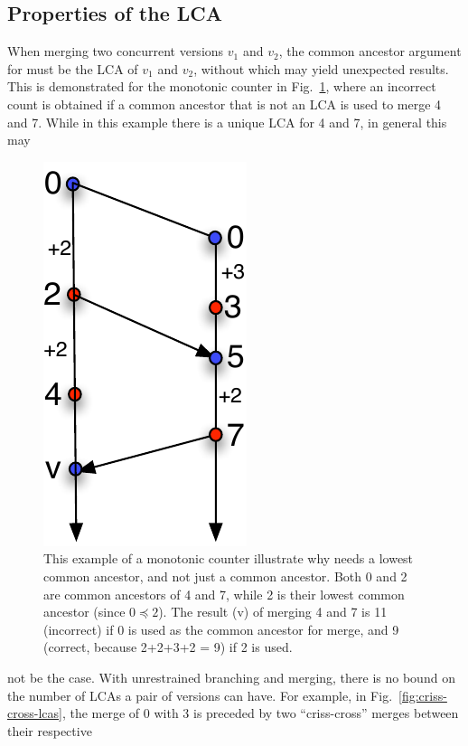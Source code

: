 \subsection{Properties of the LCA}
\label{sec:meta}

When merging two concurrent versions $v_1$ and $v_2$, the common
ancestor argument for  must be the LCA of $v_1$ and $v_2$,
without which  may yield unexpected results. This is
demonstrated for the monotonic counter in
Fig.~\ref{fig:merge-needs-lca}, where an incorrect count is obtained if a
common ancestor that is not an LCA is used to merge 4 and 7. While in
this example there is a unique LCA for 4 and 7, in general this may
\begin{figure}
\centering
\includegraphics[scale=0.6]{Figures/merge-needs-lca}
\caption{This example of a monotonic counter illustrate why 
needs a lowest common ancestor, and not just a common ancestor. Both 0
and 2 are common ancestors of 4 and 7, while 2 is their lowest common
ancestor (since $0 \preceq 2$). The result (v) of merging 4 and 7 is
11 (incorrect) if 0 is used as the common ancestor for merge, and 9
(correct, because 2+2+3+2 = 9) if 2 is used. }
\label{fig:merge-needs-lca}
\end{figure}
not be the case. With unrestrained branching and merging, there is no
bound on the number of LCAs a pair of versions can have.  For example,
in Fig.~\ref{fig:criss-cross-lcas}, the merge of 0 with 3 is preceded
by two ``criss-cross'' merges between their respective
